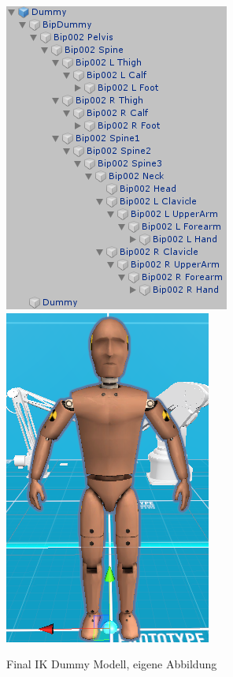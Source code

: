 \begin{figure}[h]
	\centering
	\includegraphics[width=0.4\linewidth]{Bilder/A34_DummyAufbau}
	\includegraphics[width=0.338\linewidth]{Bilder/A35_Dummy}
	\caption{Final IK Dummy Modell, eigene Abbildung}
	\label{fig:Dummy}
\end{figure}

